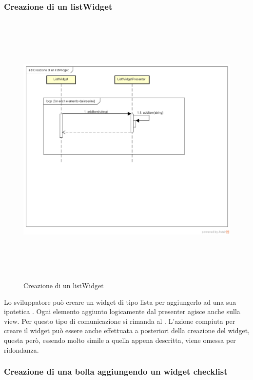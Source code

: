 \subsubsection{Creazione di un listWidget}

\label{Click di un bottone}
\begin{figure}[ht]
	\centering
	\includegraphics[width=16cm, height=14cm]{Sezioni/Diagrammi/img/Creazione di un listWidget.png}
	\caption{Creazione di un listWidget}
\end{figure}

Lo sviluppatore può creare un widget di tipo lista per aggiungerlo ad una sua ipotetica . Ogni elemento aggiunto logicamente dal presenter agisce anche sulla view. Per questo tipo di comunicazione si rimanda al  .
L'azione compiuta per creare il widget può essere anche effettuata a posteriori della creazione del widget, questa però, essendo molto simile a quella appena descritta, viene omessa per ridondanza.

\newpage

\subsubsection{Creazione di una bolla aggiungendo un widget checklist}

